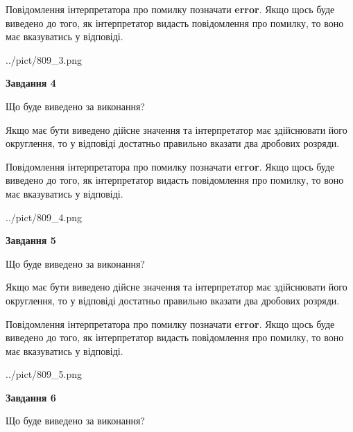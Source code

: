 \documentclass[12pt, ukrainian]{article}
\begin{document}
{\begin {Large}
Повідомлення інтерпретатора про помилку позначати \textbf{error}.
Якщо щось буде виведено до того, як інтерпретатор видасть повідомлення про помилку, 
то воно має вказуватись у відповіді. \par

\begin{center}
	{../pict/809_3.png}
\end{center}
\newpage

{\begin {center}\textbf{Завдання 4}\end {center}}\par
Що буде виведено за виконання? \par

Якщо має бути виведено дійсне значення та інтерпретатор має здійснювати його округлення, 
то у відповіді достатньо правильно вказати два дробових розряди.

Повідомлення інтерпретатора про помилку позначати \textbf{error}.
Якщо щось буде виведено до того, як інтерпретатор видасть повідомлення про помилку, 
то воно має вказуватись у відповіді. \par

\begin{center}
	{../pict/809_4.png}
\end{center}
\newpage

{\begin {center}\textbf{Завдання 5}\end {center}}\par
Що буде виведено за виконання? \par

Якщо має бути виведено дійсне значення та інтерпретатор має здійснювати його округлення, 
то у відповіді достатньо правильно вказати два дробових розряди.

Повідомлення інтерпретатора про помилку позначати \textbf{error}.
Якщо щось буде виведено до того, як інтерпретатор видасть повідомлення про помилку, 
то воно має вказуватись у відповіді. \par

\begin{center}
	{../pict/809_5.png}
\end{center}
\newpage

{\begin {center}\textbf{Завдання 6}\end {center}}\par
Що буде виведено за виконання? \par


\end{Large}}
\end{document}
